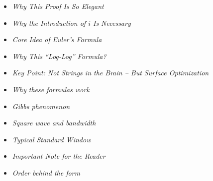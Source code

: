 \begin{DidacticBox}
	\begin{itemize}
		\item \emph{Why This Proof Is So Elegant}\dotfill \pageref{box:proof-elegant}
		\item \emph{Why the Introduction of \(i\) Is Necessary}\dotfill \pageref{box:i-necessary}
		\item \emph{Core Idea of Euler's Formula}\dotfill \pageref{box:euler-coreidea}
		\item \emph{Why This ``Log-Log'' Formula?}\dotfill \pageref{box:mandelbrot-loglog}
		\item \emph{Key Point: Not Strings in the Brain -- But \newline Surface Optimization}\dotfill \pageref{box:stringtheory-surfaceoptimization}
		\item \emph{Why these formulas work}\dotfill \pageref{box:anhangA-fourier-koeffizienten}
		\item \emph{Gibbs phenomenon}\dotfill \pageref{box:anhangA-fourier-gibbs}
	\end{itemize}
\end{DidacticBox}

\begin{PhysicsBox}
	\begin{itemize}
		\item \emph{Square wave and bandwidth}\dotfill \pageref{box:anhangA-fourier-bandbreite}
	\end{itemize}
\end{PhysicsBox}

\begin{NoteBox}
	\begin{itemize}
		\item \emph{Typical Standard Window}\dotfill \pageref{box:mandelbrot-standard-window}
		\item \emph{Important Note for the Reader}\dotfill \pageref{box:mandelbrot-reader-note}
		\item \emph{Order behind the form}\dotfill \pageref{box:anhangA-fourier-ordnung-form}
	\end{itemize}
\end{NoteBox}